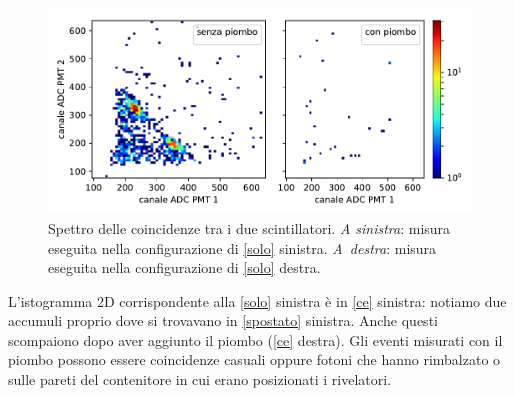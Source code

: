 \begin{figure}[h]
\centering
\includegraphics[width=\textwidth]{immagini/rimb}
\caption{\label{ce}
Spettro delle coincidenze tra i due scintillatori.
\emph{A sinistra}: misura eseguita nella configurazione di \autoref{solo} sinistra.
\emph{A~destra}: misura eseguita nella configurazione di \autoref{solo} destra.}
\end{figure}

L'istogramma 2D corrispondente alla \autoref{solo} sinistra è in \autoref{ce} sinistra: notiamo due accumuli proprio dove si trovavano in \autoref{spostato} sinistra. Anche questi scompaiono dopo aver aggiunto il piombo (\autoref{ce} destra). Gli eventi misurati con il piombo possono essere coincidenze casuali oppure fotoni che hanno rimbalzato o sulle pareti del contenitore in cui erano posizionati i rivelatori.

